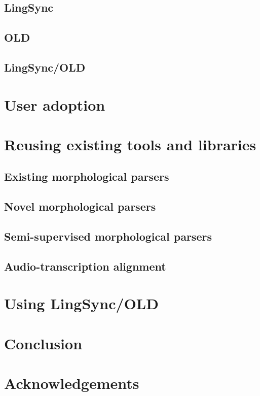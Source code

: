 \documentclass{beamer}
\begin{document}
\subsection{LingSync}\label{sec:lingsync}
\subsection{OLD}\label{sec:old}
\subsection{LingSync/OLD}
\section{User adoption}
\section{Reusing existing tools and libraries}
\subsection{Existing morphological parsers}
\subsection{Novel morphological parsers}
\subsection{Semi-supervised morphological parsers}
\subsection{Audio-transcription alignment}
\section{Using LingSync/OLD}\label{open-data}
\section{Conclusion}
\section*{Acknowledgements}
\end{document}
